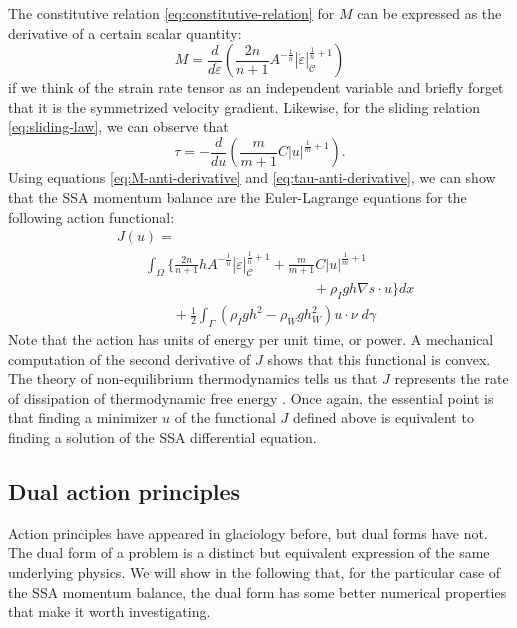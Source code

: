 \documentclass[twocolumn,letterpaper]{igs}
\begin{document}
The constitutive relation \eqref{eq:constitutive-relation} for $M$ can be expressed as the derivative of a certain scalar quantity:
\begin{equation}
    M = \frac{d}{d\dot\varepsilon}\left(\frac{2n}{n + 1}A^{-\frac{1}{n}}|\dot\varepsilon|_{\mathscr C}^{\frac{1}{n} + 1}\right)
    \label{eq:M-anti-derivative}
\end{equation}
if we think of the strain rate tensor as an independent variable and briefly forget that it is the symmetrized velocity gradient.
Likewise, for the sliding relation \eqref{eq:sliding-law}, we can observe that
\begin{equation}
    \tau = -\frac{d}{du}\left(\frac{m}{m + 1}C|u|^{\frac{1}{m} + 1}\right).
    \label{eq:tau-anti-derivative}
\end{equation}
Using equations \eqref{eq:M-anti-derivative} and \eqref{eq:tau-anti-derivative}, we can show that the SSA momentum balance are the Euler-Lagrange equations for the following action functional:
\begin{align}
    & J(u) = \nonumber\\
    & \qquad\int_\Omega\Bigg\{\frac{2n}{n + 1}hA^{-\frac{1}{n}}|\dot\varepsilon|_{\mathscr{C}}^{\frac{1}{n} + 1} + \frac{m}{m + 1}C|u|^{\frac{1}{m} + 1} \nonumber\\
    & \qquad\qquad\qquad\qquad\qquad\qquad\qquad + \rho_I gh\nabla s\cdot u\Bigg\}dx  \nonumber \\
    & \qquad\qquad + \frac{1}{2}\int_\Gamma\left(\rho_Igh^2 - \rho_Wgh_W^2\right)u\cdot\nu\; d\gamma
    \label{eq:ssa-primal-action}
\end{align}
Note that the action has units of energy per unit time, or power.
A mechanical computation of the second derivative of $J$ shows that this functional is convex.
The theory of non-equilibrium thermodynamics tells us that $J$ represents the rate of dissipation of thermodynamic free energy \citep{edelen1972nonlinear}.
Once again, the essential point is that finding a minimizer $u$ of the functional $J$ defined above is equivalent to finding a solution of the SSA differential equation.


\subsection{Dual action principles}
\label{subsec:dual-action-principles}

Action principles have appeared in glaciology before, but dual forms have not.
The dual form of a problem is a distinct but equivalent expression of the same underlying physics.
We will show in the following that, for the particular case of the SSA momentum balance, the dual form has some better numerical properties that make it worth investigating.
\end{document}
